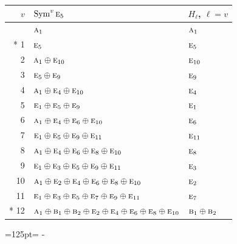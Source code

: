 \documentclass[10pt,a4paper]{article}
\newcommand{\needspace}[1]{\par\penalty-100\begingroup\dimen0=#1\relax\dimen2=\pagegoal
  \advance\dimen2-\pagetotal\ifdim\dimen0>\dimen2\relax\ifdim\dimen2>0pt\vfil\break\fi\fi
  \endgroup}
\numberwithin{equation}{section}
\newcommand{\irr}[1]{\text{\normalfont\scshape #1}}
\begin{document}
{\small\begin{longtable}{@{}rll@{}}\toprule
$v$ & $\operatorname{Sym}^{v}\irr{e}_{5}$ & $H_\ell$, $\ell = v$\\\midrule\endhead
\bottomrule\endfoot\endlastfoot
0 & $\irr{a}_{1}$ & $\irr{a}_{1}$\\*
1 & $\irr{e}_{5}$ & $\irr{e}_{5}$\\
2 & $\irr{a}_{1} \oplus \irr{e}_{10}$ & $\irr{e}_{10}$\\
3 & $\irr{e}_{5} \oplus \irr{e}_{9}$ & $\irr{e}_{9}$\\
4 & $\irr{a}_{1} \oplus \irr{e}_{4} \oplus \irr{e}_{10}$ & $\irr{e}_{4}$\\
5 & $\irr{e}_{1} \oplus \irr{e}_{5} \oplus \irr{e}_{9}$ & $\irr{e}_{1}$\\
6 & $\irr{a}_{1} \oplus \irr{e}_{4} \oplus \irr{e}_{6} \oplus \irr{e}_{10}$ & $\irr{e}_{6}$\\
7 & $\irr{e}_{1} \oplus \irr{e}_{5} \oplus \irr{e}_{9} \oplus \irr{e}_{11}$ & $\irr{e}_{11}$\\
8 & $\irr{a}_{1} \oplus \irr{e}_{4} \oplus \irr{e}_{6} \oplus \irr{e}_{8} \oplus \irr{e}_{10}$ & $\irr{e}_{8}$\\
9 & $\irr{e}_{1} \oplus \irr{e}_{3} \oplus \irr{e}_{5} \oplus \irr{e}_{9} \oplus \irr{e}_{11}$ & $\irr{e}_{3}$\\
10 & $\irr{a}_{1} \oplus \irr{e}_{2} \oplus \irr{e}_{4} \oplus \irr{e}_{6} \oplus \irr{e}_{8} \oplus \irr{e}_{10}$ & $\irr{e}_{2}$\\
11 & $\irr{e}_{1} \oplus \irr{e}_{3} \oplus \irr{e}_{5} \oplus \irr{e}_{7} \oplus \irr{e}_{9} \oplus \irr{e}_{11}$ & $\irr{e}_{7}$\\*
12 & $\irr{a}_{1} \oplus \irr{b}_{1} \oplus \irr{b}_{2} \oplus \irr{e}_{2} \oplus \irr{e}_{4} \oplus \irr{e}_{6} \oplus \irr{e}_{8} \oplus \irr{e}_{10}$ & $\irr{b}_{1} \oplus \irr{b}_{2}$\\
\bottomrule\end{longtable}}
\needspace{125pt}
\end{document}
